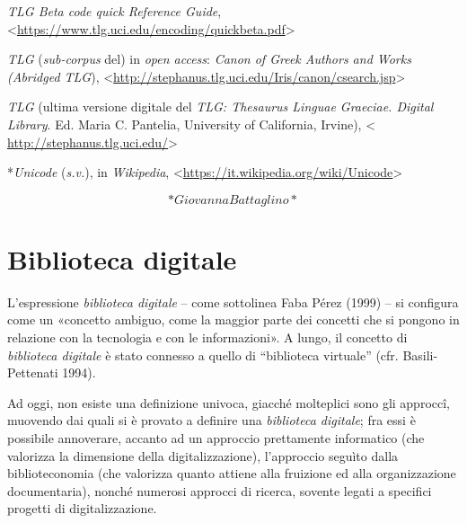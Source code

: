 \documentclass[
  b5paper,
  twoside,
  11pt,
  chapterprefix=false,
  bibliography=totocnumbered,
  parskip=0]{scrbook}
\begin{document}
\emph{TLG Beta code quick Reference Guide},
\textless{}\href{https://www.tlg.uci.edu/encoding/quickbeta.pdf}{{https://www.tlg.uci.edu/encoding/quickbeta.pdf}}\textgreater{}

\emph{TLG} (\emph{sub-corpus} del) in \emph{open access}: \emph{Canon of Greek Authors and
Works (Abridged TLG}),
\textless{}\href{http://stephanus.tlg.uci.edu/Iris/canon/csearch.jsp}{{http://stephanus.tlg.uci.edu/Iris/canon/csearch.jsp}}\textgreater{}

\emph{TLG} (ultima versione digitale del \emph{TLG: Thesaurus Linguae Graeciae.
Digital Library}. Ed. Maria C. Pantelia, University of California,
Irvine), \textless{}
\href{http://stephanus.tlg.uci.edu/}{{http://stephanus.tlg.uci.edu/}}\textgreater{}

*\emph{Unicode} (\emph{s.v.}), in \emph{Wikipedia},
\textless{}\href{https://it.wikipedia.org/wiki/Unicode}{{https://it.wikipedia.org/wiki/Unicode}}\textgreater{}

\[*Giovanna Battaglino*\]

\hypertarget{biblioteca-digitale}{%
\chapter{Biblioteca digitale}\label{biblioteca-digitale}}

L'espressione \emph{biblioteca digitale} -- come sottolinea Faba Pérez (1999)
-- si configura come un «concetto ambiguo, come la maggior parte dei
concetti che si pongono in relazione con la tecnologia e con le
informazioni». A lungo, il concetto di \emph{biblioteca digitale} è stato
connesso a quello di \enquote{biblioteca virtuale} (cfr. Basili-Pettenati 1994).

Ad oggi, non esiste una definizione univoca, giacché molteplici sono gli
approccî, muovendo dai quali si è provato a definire una \emph{biblioteca
digitale}; fra essi è possibile annoverare, accanto ad un approccio
prettamente informatico (che valorizza la dimensione della
digitalizzazione), l'approccio seguìto dalla biblioteconomia (che
valorizza quanto attiene alla fruizione ed alla organizzazione
documentaria), nonché numerosi approcci di ricerca, sovente legati a
specifici progetti di digitalizzazione.
\end{document}
